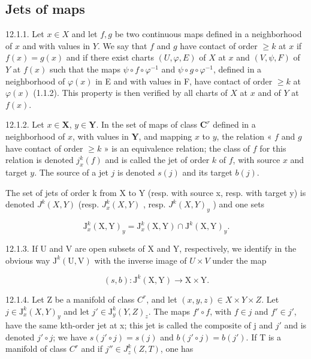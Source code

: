 \subsection{Jets of maps}

12.1.1. Let \(x \in X\) and let \(f, g\) be two continuous maps defined in a neighborhood of \(x\) and with values in \(Y\). We say that \(f\) and \(g\) have contact of order \(\geqslant k\) at \(x\) if \(f(x) = g(x)\) and if there exist charts \((U, \varphi, E)\) of \(X\) at \(x\) and \((V, \psi, F)\) of \(Y\) at \(f(x)\) such that the maps \(\psi \circ f \circ \varphi^{-1}\) and \(\psi \circ g \circ \varphi^{-1}\), defined in a neighborhood of \(\varphi(x)\) in E and with values in F, have contact of order \(\geqslant k\) at \(\varphi(x)\) (1.1.2). This property is then verified by all charts of \(X\) at \(x\) and of \(Y\) at \(f(x)\).

12.1.2. Let \(x \in \mathbf{X}\), \(y \in \mathbf{Y}\). In the set of maps of class \(\mathbf{C}^r\) defined in a neighborhood of \(x\), with values in \(\mathbf{Y}\), and mapping \(x\) to \(y\), the relation « \(f\) and \(g\) have contact of order \(\geqslant k\) » is an equivalence relation; the class of \(f\) for this relation is denoted \(j_x^k(f)\) and is called the jet of order \(k\) of \(f\), with source \(x\) and target \(y\). The source of a jet \(j\) is denoted \(s(j)\) and its target \(b(j)\).

The set of jets of order k from X to Y (resp. with source x, resp. with target y) is denoted \(J^{k}(X, Y)\) (resp. \(J_{x}^{k}(X, Y)\) , resp. \(J^{k}(X, Y)_{y}\) ) and one sets

\[
\mathrm{J} _ {x} ^ {k} (\mathrm{X}, \mathrm{Y}) _ {y} = \mathrm{J} _ {x} ^ {k} (\mathrm{X}, \mathrm{Y}) \cap \mathrm{J} ^ {k} (\mathrm{X}, \mathrm{Y}) _ {y}.
\]

12.1.3. If U and V are open subsets of X and Y, respectively, we identify in the obvious way \(\mathrm{J}^{k}(\mathrm{U},\mathrm{V})\) with the inverse image of \(U \times V\) under the map

\[
(s, b): \mathrm{J} ^ {k} (\mathrm{X}, \mathrm{Y}) \rightarrow \mathrm{X} \times \mathrm{Y}.
\]

12.1.4. Let Z be a manifold of class \(C^{r}\), and let \((x, y, z) \in X \times Y \times Z\). Let \(j \in \mathrm{J}_{x}^{k}(X, Y)_{y}\) and let \(j' \in \mathrm{J}_{y}^{k}(Y, Z)_{z}\). The maps \(f' \circ f\), with \(f \in j\) and \(f' \in j'\), have the same kth-order jet at x; this jet is called the composite of j and \(j'\) and is denoted \(j' \circ j\); we have \(s(j' \circ j) = s(j)\) and \(b(j' \circ j) = b(j')\). If T is a manifold of class \(C^{r}\) and if \(j'' \in J_{z}^{k}(Z, T)\), one has

